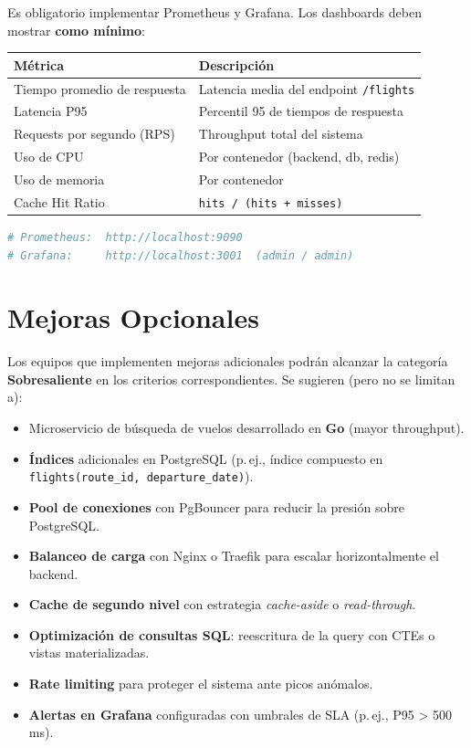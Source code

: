 \documentclass[12pt,a4paper]{article}
\begin{document}
Es obligatorio implementar Prometheus y Grafana. Los dashboards deben mostrar \textbf{como mínimo}:

\begin{center}
\begin{tabular}{|l|l|}
\hline
\textbf{Métrica}              & \textbf{Descripción} \\
\hline
Tiempo promedio de respuesta  & Latencia media del endpoint \texttt{/flights} \\
Latencia P95                  & Percentil 95 de tiempos de respuesta \\
Requests por segundo (RPS)    & Throughput total del sistema \\
Uso de CPU                    & Por contenedor (backend, db, redis) \\
Uso de memoria                & Por contenedor \\
Cache Hit Ratio               & \texttt{hits / (hits + misses)} \\
\hline
\end{tabular}
\end{center}

\begin{lstlisting}[language=bash, caption={Acceso a los servicios de observabilidad}]
# Prometheus:  http://localhost:9090
# Grafana:     http://localhost:3001  (admin / admin)
\end{lstlisting}

\section{Mejoras Opcionales}

Los equipos que implementen mejoras adicionales podrán alcanzar la categoría \textbf{Sobresaliente} en los criterios correspondientes. Se sugieren (pero no se limitan a):

\begin{itemize}
  \item Microservicio de búsqueda de vuelos desarrollado en \textbf{Go} (mayor throughput).
  \item \textbf{Índices} adicionales en PostgreSQL (p.\,ej., índice compuesto en \texttt{flights(route\_id, departure\_date)}).
  \item \textbf{Pool de conexiones} con PgBouncer para reducir la presión sobre PostgreSQL.
  \item \textbf{Balanceo de carga} con Nginx o Traefik para escalar horizontalmente el backend.
  \item \textbf{Cache de segundo nivel} con estrategia \textit{cache-aside} o \textit{read-through}.
  \item \textbf{Optimización de consultas SQL}: reescritura de la query con CTEs o vistas materializadas.
  \item \textbf{Rate limiting} para proteger el sistema ante picos anómalos.
  \item \textbf{Alertas en Grafana} configuradas con umbrales de SLA (p.\,ej., P95 > 500 ms).
\end{itemize}
\end{document}
